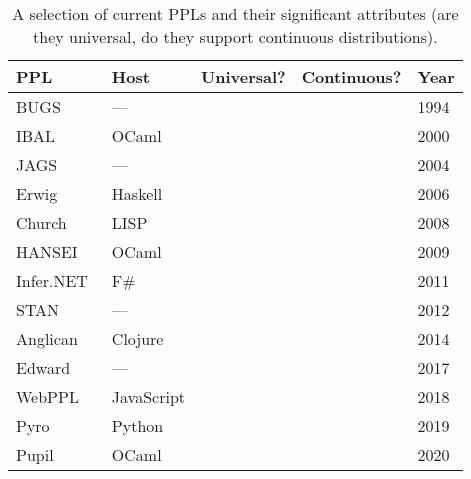 \documentclass[sigconf]{acmart}
\newcommand{\cmark}{\textcolor{green1}{\checkmark}}%
\newcommand{\xmark}{\textcolor{red1}{\ding{55}}}%
\newcommand{\pupil}{Pupil\xspace}
\begin{document}
\begin{table}
  \centering
  \begin{tabular}{ l l c c l }
    \toprule
    \textbf{PPL}
    & \textbf{Host}
    & \textbf{Universal?}
    & \textbf{Continuous?}
    & \textbf{Year} \\
    \midrule

    BUGS~\cite{gilks1994bugs}
    & --- & \xmark & \cmark & 1994 \\

    IBAL~\cite{ibal}
    & OCaml & \xmark & \xmark & 2000 \\

    JAGS~\cite{plummer2004jags}
    & --- & \xmark & \cmark & 2004 \\

    Erwig~\cite{erwig}
    & Haskell & \cmark & \cmark & 2006\\

    Church~\cite{goodman2012church}
    & LISP & \cmark & \cmark & 2008 \\

    HANSEI~\cite{kiselyov2009embedded}
    & OCaml & \xmark & \xmark & 2009 \\

    Infer.NET~\cite{wang2011using}
    & F\# & \xmark & \cmark & 2011 \\

    STAN~\cite{carpenter2017stan}
    & --- & \xmark & \cmark & 2012 \\

    Anglican~\cite{anglican-smc}
    & Clojure & \cmark & \cmark & 2014 \\

    Edward~\cite{edward}
    & --- & \xmark & \cmark & 2017\\

    WebPPL~\cite{mobus2018structure}
    & JavaScript & \cmark & \cmark & 2018 \\

    Pyro~\cite{bingham2019pyro}
    & Python & \cmark & \cmark & 2019 \\

    \pupil
    & OCaml & \cmark & \cmark & 2020 \\
    \bottomrule
  \end{tabular}
  \caption{\label{tab:ppl-summ}
    A selection of current PPLs and their significant attributes (are they universal, do they support continuous distributions).}
\end{table}
\end{document}

